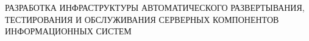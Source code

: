 \documentclass[a4paper,12pt]{article} %
\begin{document}
РАЗРАБОТКА ИНФРАСТРУКТУРЫ АВТОМАТИЧЕСКОГО РАЗВЕРТЫВАНИЯ, ТЕСТИРОВАНИЯ И ОБСЛУЖИВАНИЯ СЕРВЕРНЫХ КОМПОНЕНТОВ ИНФОРМАЦИОННЫХ СИСТЕМ
\tableofcontents
\newpage

\newpage

\newpage


\newpage

\end{document}
